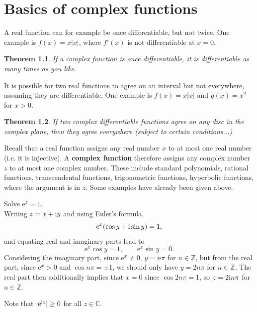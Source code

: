 \documentclass[letter-paper]{tufte-book}
\newtheorem{theorem}{\color{pastel-blue}Theorem}[section]
\newenvironment{example}[1][Example]{\begin{trivlist}
\item[\hskip \labelsep {\bfseries #1}]}{\end{trivlist}}
\newcommand{\ex}{\mathrm{e}}
\newcommand{\zi}{{\rm i}}
\newcommand\Def[1]{\textbf{#1}}
\begin{document}
\chapter{Basics of complex functions}

A real function can for example be once differentiable, but not
twice. One example is $f(x) = x|x|$, where $f'(x)$ is not differentiable at
$x=0$.

\begin{theorem}
  If a complex function is once differentiable, it is differentiable as many
  times as you like.
\end{theorem}

It is possible for two real functions to agree on an interval but not
everywhere, assuming they are differentiable. One example is $f(x) = x|x|$ and
$g(x) = x^2$ for $x>0$.

\begin{theorem}
  If two complex differentiable functions agree on any disc in the complex
  plane, then they agree everywhere (subject to certain conditions...)
\end{theorem}

Recall that a real function assigns any real number $x$ to at most one real
number (i.e. it is injective). A \Def{complex function} therefore assigns any
complex number $z$ to at most one complex number. These include standard
polynomials, rational functions, transcendental functions, trigonometric
functions, hyperbolic functions, where the argument is in $z$. Some examples
have already been given above.

\begin{example}
  Solve $\ex^z = 1$.\\
  
  Writing $z = x + \zi y$ and using Euler's formula,
  \begin{equation*}
    \ex^x (\cos y + \zi \sin y) = 1,
  \end{equation*}
  and equating real and imaginary parts lead to
  \begin{equation*}
    \ex^x \cos y = 1, \qquad \ex^x \sin y = 0.
  \end{equation*}
  Considering the imaginary part, since $\ex^x \neq 0$, $y = n\pi$ for $n \in
  \mathbb{Z}$, but from the real part, since $\ex^x > 0$ and $\cos n\pi = \pm
  1$, we should only have $y = 2n\pi$ for $n \in \mathbb{Z}$. The real part then
  additionally implies that $x=0$ since $\cos 2n\pi = 1$, so $z = 2\zi n \pi$
  for $n \in \mathbb{Z}$.
\end{example}
Note that $|\ex^{\zi z}| \geq 0$ for all $z \in \mathbb{C}$.
\end{document}
